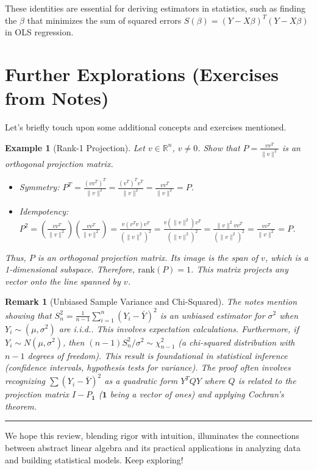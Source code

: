 \documentclass[11pt, a4paper]{article}
\theoremstyle{mydefinitionstyle}
\newtheorem{example}{Example}[section]
\newtheorem{remark}{Remark}[section]
\theoremstyle{mytheoremstyle}
\newcommand{\R}{\mathbb{R}}
\newcommand{\rank}{\text{rank}}
\begin{document}
These identities are essential for deriving estimators in statistics, such as finding the $\beta$ that minimizes the sum of squared errors $S(\beta) = (Y - X\beta)^T (Y - X\beta)$ in OLS regression.

\section{Further Explorations (Exercises from Notes)}

Let's briefly touch upon some additional concepts and exercises mentioned.

\begin{example}[Rank-1 Projection] \label{ex:rank1_proj}
    Let $v \in \R^n$, $v \neq 0$. Show that $P = \frac{vv^T}{\|v\|^2}$ is an orthogonal projection matrix.
    \begin{itemize}
        \item Symmetry: $P^T = \frac{(vv^T)^T}{\|v\|^2} = \frac{(v^T)^T v^T}{\|v\|^2} = \frac{vv^T}{\|v\|^2} = P$.
        \item Idempotency: $P^2 = (\frac{vv^T}{\|v\|^2})(\frac{vv^T}{\|v\|^2}) = \frac{v(v^T v)v^T}{(\|v\|^2)^2} = \frac{v(\|v\|^2)v^T}{(\|v\|^2)^2} = \frac{\|v\|^2 vv^T}{(\|v\|^2)^2} = \frac{vv^T}{\|v\|^2} = P$.
    \end{itemize}
    Thus, $P$ is an orthogonal projection matrix. Its image is the span of $v$, which is a 1-dimensional subspace. Therefore, $\rank(P) = 1$. This matrix projects any vector onto the line spanned by $v$.
\end{example}

\begin{remark}[Unbiased Sample Variance and Chi-Squared] \label{rem:sample_var}
    The notes mention showing that $S_n^2 = \frac{1}{n-1} \sum_{i=1}^n (Y_i - \bar{Y})^2$ is an unbiased estimator for $\sigma^2$ when $Y_i \sim (\mu, \sigma^2)$ are i.i.d.. This involves expectation calculations. Furthermore, if $Y_i \sim N(\mu, \sigma^2)$, then $(n-1)S_n^2 / \sigma^2 \sim \chi^2_{n-1}$ (a chi-squared distribution with $n-1$ degrees of freedom). This result is foundational in statistical inference (confidence intervals, hypothesis tests for variance). The proof often involves recognizing $\sum (Y_i - \bar{Y})^2$ as a quadratic form $Y^T Q Y$ where $Q$ is related to the projection matrix $I - P_{\mathbf{1}}$ ($\mathbf{1}$ being a vector of ones) and applying Cochran's theorem.
\end{remark}


\bigskip
\hrule
\bigskip

We hope this review, blending rigor with intuition, illuminates the connections between abstract linear algebra and its practical applications in analyzing data and building statistical models. Keep exploring!
\end{document}
